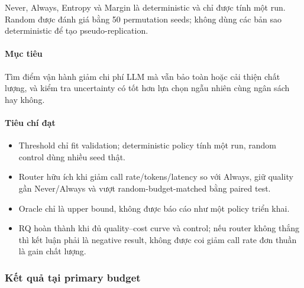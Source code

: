 Never, Always, Entropy và Margin là deterministic và chỉ được tính một run. Random được đánh giá bằng 50 permutation seeds; không dùng các bản sao deterministic để tạo pseudo-replication.

\paragraph{Mục tiêu}

Tìm điểm vận hành giảm chi phí LLM mà vẫn bảo toàn hoặc cải thiện chất lượng, và kiểm tra uncertainty có tốt hơn lựa chọn ngẫu nhiên cùng ngân sách hay không.

\paragraph{Tiêu chí đạt}

\begin{itemize}
\item Threshold chỉ fit validation; deterministic policy tính một run, random control
dùng nhiều seed thật.

\item Router hữu ích khi giảm call rate/tokens/latency so với Always, giữ quality gần
Never/Always và vượt random-budget-matched bằng paired test.

\item Oracle chỉ là upper bound, không được báo cáo như một policy triển khai.
\item RQ hoàn thành khi đủ quality--cost curve và control; nếu router không thắng thì
kết luận phải là negative result, không được coi giảm call rate đơn thuần là gain chất lượng.

\end{itemize}

\subsubsection*{Kết quả tại primary budget}

